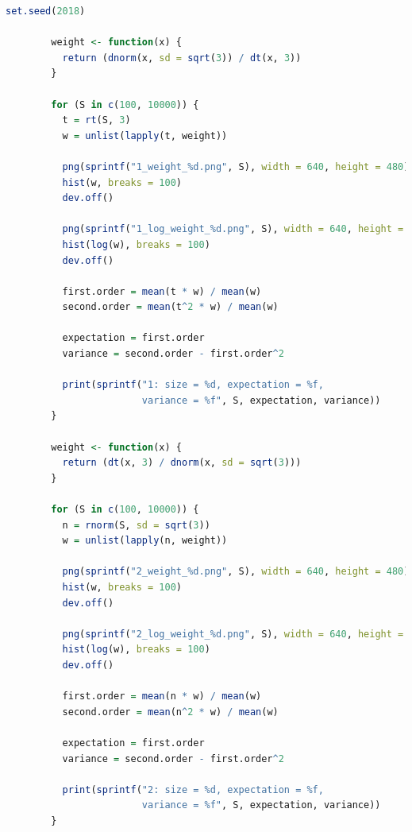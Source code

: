 \documentclass{article}
\begin{document}
{
    \begin{lstlisting}[language=R]
        set.seed(2018)

        weight <- function(x) {
          return (dnorm(x, sd = sqrt(3)) / dt(x, 3))
        }
        
        for (S in c(100, 10000)) {
          t = rt(S, 3)
          w = unlist(lapply(t, weight))
          
          png(sprintf("1_weight_%d.png", S), width = 640, height = 480)
          hist(w, breaks = 100)
          dev.off()
          
          png(sprintf("1_log_weight_%d.png", S), width = 640, height = 480)
          hist(log(w), breaks = 100)
          dev.off()
          
          first.order = mean(t * w) / mean(w)
          second.order = mean(t^2 * w) / mean(w)
          
          expectation = first.order
          variance = second.order - first.order^2
          
          print(sprintf("1: size = %d, expectation = %f, 
                        variance = %f", S, expectation, variance))
        }
        
        weight <- function(x) {
          return (dt(x, 3) / dnorm(x, sd = sqrt(3)))
        }
        
        for (S in c(100, 10000)) {
          n = rnorm(S, sd = sqrt(3))
          w = unlist(lapply(n, weight))
          
          png(sprintf("2_weight_%d.png", S), width = 640, height = 480)
          hist(w, breaks = 100)
          dev.off()
          
          png(sprintf("2_log_weight_%d.png", S), width = 640, height = 480)
          hist(log(w), breaks = 100)
          dev.off()
          
          first.order = mean(n * w) / mean(w)
          second.order = mean(n^2 * w) / mean(w)
          
          expectation = first.order
          variance = second.order - first.order^2
          
          print(sprintf("2: size = %d, expectation = %f, 
                        variance = %f", S, expectation, variance))
        }
    \end{lstlisting}
}

\clearpage
\end{document}
